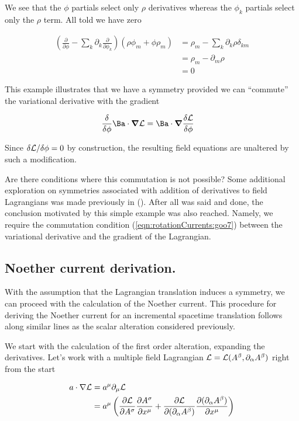 We see that the $\phi$ partials select only $\rho$ derivatives whereas the $\phi_k$ partials select only the $\rho$ term.  All told we have zero

\begin{align*}
\left( \frac{\partial }{\partial \phi} - \sum_k \partial_k \frac{\partial }{\partial \phi_k}\right) (\rho \phi_m + \phi \rho_m) 
&=
\rho_m - \sum_k \partial_k \rho \delta_{km} \\
&=
\rho_m - \partial_m \rho  \\
&= 0
\end{align*}

This example illustrates that we have a symmetry provided we can ``commute'' the variational derivative with the gradient

\begin{align}\label{eqn:rotationCurrents:goo7}
\frac{\delta }{\delta \phi} \Ba \cdot \spacegrad \LL
&=
\Ba \cdot \spacegrad \frac{\delta \LL}{\delta \phi} 
\end{align}

Since ${\delta \LL}/{\delta \phi} = 0$ by construction, the resulting field equations are unaltered by such a modification.

Are there conditions where this commutation is not possible?  Some additional exploration on symmetries associated with addition of derivatives to field Lagrangians was made previously in (\cite{stressEnergyNoethers}).  After all was said and done, the conclusion motivated by this simple example was also reached.  Namely, we require the commutation condition (\ref{eqn:rotationCurrents:goo7}) between the variational derivative and the gradient of the Lagrangian.

\subsection{Noether current derivation.}

With the assumption that the Lagrangian translation induces a symmetry, we can proceed with the calculation of the Noether current.  This procedure for deriving the Noether current for an incremental spacetime translation follows along similar lines as the scalar alteration considered previously.

We start with the calculation of the first order alteration, expanding the derivatives.  Let's work with a multiple field Lagrangian $\LL = \LL(A^\beta, \partial_\alpha A^\beta)$ right from the start

\begin{align*}
a \cdot \grad \LL
&=
a^\mu \partial_\mu \LL \\
&=
a^\mu \left(
\PD{A^\sigma}{\LL} \PD{x^\mu}{A^\sigma}
+\PD{(\partial_\alpha A^\beta)}{\LL} \PD{x^\mu}{(\partial_\alpha A^\beta)}
\right) \\
\end{align*}

